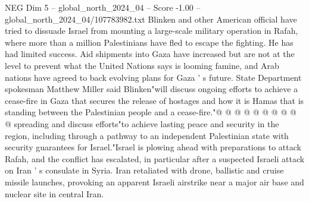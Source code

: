 \begin{textsample}{NEG Dim 5 – global\_north\_2024\_04 – Score -1.00 – global\_north\_2024\_04/107783982.txt}
Blinken and other American official have tried to dissuade Israel from mounting a large-scale military operation in Rafah, where more than a million Palestinians have fled to escape the fighting.
He has had limited success.
Aid shipments into Gaza have increased but are not at the level to prevent what the United Nations says is looming famine, and Arab nations have agreed to back evolving plans for Gaza ' s future.
State Department spokesman Matthew Miller said Blinken"will discuss ongoing efforts to achieve a cease-fire in Gaza that secures the release of hostages and how it is Hamas that is standing between the Palestinian people and a cease-fire."@ @ @ @ @ @ @ @ @ @ spreading and discuss efforts"to achieve lasting peace and security in the region, including through a pathway to an independent Palestinian state with security guarantees for Israel."Israel is plowing ahead with preparations to attack Rafah, and the conflict has escalated, in particular after a suspected Israeli attack on Iran ' s consulate in Syria.
Iran retaliated with drone, ballistic and cruise missile launches, provoking an apparent Israeli airstrike near a major air base and nuclear site in central Iran.

\end{textsample}
